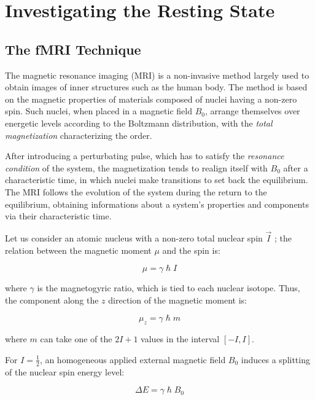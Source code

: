 \documentclass[12pt,openright,twoside,a4paper]{book}
\begin{document}
\clearpage

\section{Investigating the Resting State}

\subsection{The fMRI Technique}

The magnetic resonance imaging (MRI) is a non-invasive method largely used to obtain images of inner structures such as the human body.
The method is based on the magnetic properties of materials composed of nuclei having a non-zero spin.
Such nuclei, when placed in a magnetic  field $B_0$, arrange themselves over energetic levels according to the Boltzmann distribution, with the \textit{total magnetization} characterizing the order.

After introducing a perturbating pulse, which has to satisfy the \textit{resonance condition} of the system, the magnetization tends to realign itself with $B_0$ after a characteristic time, in which nuclei make transitions to set back the equilibrium.
The MRI follows the evolution of the system during the return to the equilibrium, obtaining informations about a system's properties and components via their characteristic time.

Let us consider an atomic nucleus with a non-zero total nuclear spin $\overrightarrow{I}$ ; the relation between the magnetic moment $\mu$ and the spin is:

\begin{equation}
\mu =\gamma  \hslash I
\end{equation}

where $\gamma$ is the magnetogyric ratio, which is tied to each nuclear isotope. Thus, the component along the $z$ direction of the magnetic moment is:

\begin{equation}
\mu_z =\gamma  \hslash m
\end{equation}

where $m$ can take one of the $2I+1$ values in the interval $[-I, I]$.

For $I=\frac{1}{2}$, an homogeneous applied external magnetic  field $B_0$ induces a splitting of the nuclear spin energy level:

\begin{equation}
\Delta E=\gamma  \hslash B_0
\end{equation}
\end{document}
